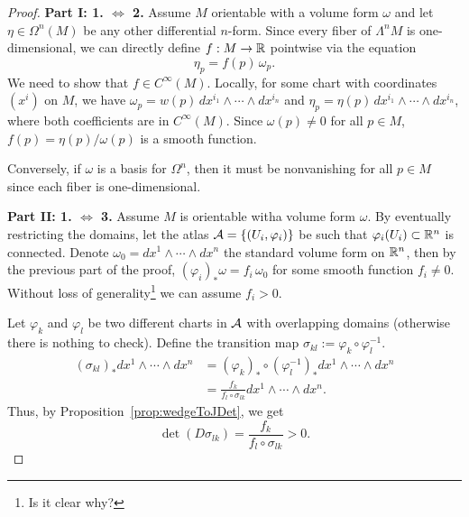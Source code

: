 \begin{proof}
  \textbf{Part I: 1. $\Leftrightarrow$ 2.}
  Assume $M$ orientable with a volume form $\omega$ and let $\eta\in\Omega^n(M)$ be any other differential $n$-form.
  Since every fiber of $\Lambda^n M$ is one-dimensional, we can directly define $f:M \to \mathbb{R}$ pointwise via the equation
  \[
    \eta_p = f(p)\,\omega_p.
  \]
  We need to show that $f\in C^\infty(M)$.
  Locally, for some chart with coordinates $(x^i)$ on $M$, we have $\omega_p = w(p)\, dx^{i_1}\wedge\cdots\wedge dx^{i_n}$ and $\eta_p = \eta(p)\, dx^{i_1}\wedge\cdots\wedge dx^{i_n}$, where both coefficients are in  $C^\infty(M)$.
  Since $\omega(p) \neq 0$ for all $p\in M$, $f(p) = \eta(p)/\omega(p)$ is a smooth function.

  Conversely, if $\omega$ is a basis for $\Omega^n$, then it must be nonvanishing for all $p\in M$ since each fiber is one-dimensional.
  \medskip

  \textbf{Part II: 1. $\Leftrightarrow$ 3.}
  Assume $M$ is orientable witha volume form $\omega$.
  By eventually restricting the domains, let the atlas $\mathcal{A} = \{(U_i, \varphi_i)\}$ be such that $\varphi_i(U_i) \subset \mathbb{R}^n$ is connected.
  Denote $\omega_0 = dx^1 \wedge\cdots\wedge dx^n$ the standard volume form on $\mathbb{R}^n$, then by the previous part of the proof, $(\varphi_i)_*\omega = f_i\,\omega_0$ for some smooth function $f_i \neq 0$.
  Without loss of generality\footnote{Is it clear why?} we can assume $f_i > 0$.

  Let $\varphi_k$ and $\varphi_l$ be two different charts in $\mathcal{A}$ with overlapping domains (otherwise there is nothing to check).
  Define the transition map $\sigma_{kl} := \varphi_k\circ\varphi_l^{-1}$.
  \begin{align}
    (\sigma_{kl})_* dx^1\wedge\cdots\wedge dx^n & = (\varphi_k)_* \circ (\varphi_l^{-1})_* dx^1\wedge \cdots\wedge dx^n \\
                                                & = \frac{f_k}{f_l \circ \sigma_{lk}} dx^1\wedge \cdots\wedge dx^n.
  \end{align}
  Thus, by Proposition~\ref{prop:wedgeToJDet}, we get
  \begin{equation}
    \det(D\sigma_{lk}) = \frac{f_k}{f_l \circ \sigma_{lk}} > 0.
  \end{equation}


\end{proof}
